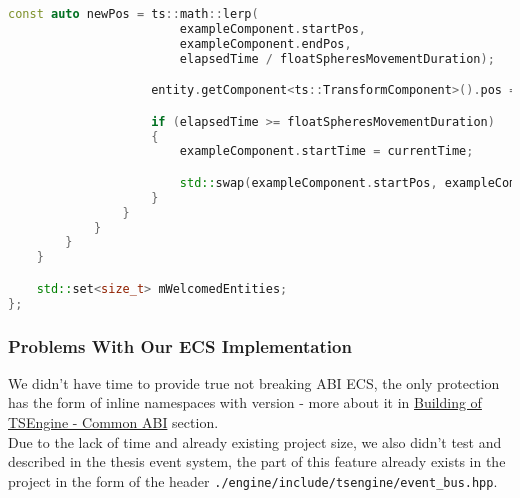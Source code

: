 \begin{itemize}
\begin{lstlisting}[language=c++, caption=Example system (./game/systems/example\_system.hpp)]
                    const auto newPos = ts::math::lerp(
                        exampleComponent.startPos,
                        exampleComponent.endPos,
                        elapsedTime / floatSpheresMovementDuration);

                    entity.getComponent<ts::TransformComponent>().pos = newPos;

                    if (elapsedTime >= floatSpheresMovementDuration)
                    {
                        exampleComponent.startTime = currentTime;

                        std::swap(exampleComponent.startPos, exampleComponent.endPos);
                    }
                }
            }
        }
    }

    std::set<size_t> mWelcomedEntities;
};
\end{lstlisting}
\end{itemize}

\newpage
\subsubsection{Problems With Our ECS Implementation}
We didn't have time to provide true not breaking ABI ECS, the only protection has the form of inline namespaces with version - more about it in \hyperref[sec:abi]{Building of TSEngine - Common ABI} section.\\
Due to the lack of time and already existing project size, we also didn't test and described in the thesis event system, the part of this feature already exists in the project in the form of the header \texttt{./engine/include/tsengine/event\_bus.hpp}.
